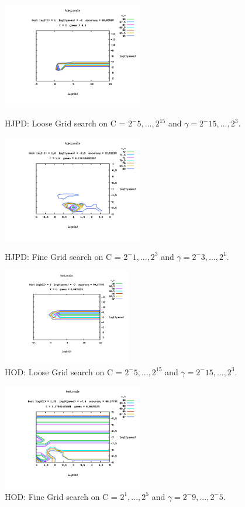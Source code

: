 \documentclass[11pt,nocopyrightspace]{config}
\begin{document}
\begin{figure}[p]
	\centering
	\includegraphics[width=0.55\textwidth]{coarseGridHjpd}
	\caption{HJPD: Loose Grid search on C = $2^-5,...,2^15$ and $\gamma=2^-15,...,2^3$.}
	\label{fig:looseHjpd}
	\includegraphics[width=0.55\textwidth]{fineGridHjpd}
	\caption{HJPD: Fine Grid search on C = $2^-1,...,2^3$ and $\gamma=2^-3,...,2^1$.}
	\label{fig:fineHjpd}
	\includegraphics[width=0.5\textwidth]{coarseGridHod}
	\caption{HOD: Loose Grid search on C = $2^-5,...,2^15$ and $\gamma=2^-15,...,2^3$.}
	\label{fig:looseHod}
\end{figure}
\begin{figure}[t]
	\centering
	\includegraphics[width=0.55\textwidth]{fineGridHod}
	\caption{HOD: Fine Grid search on C = $2^1,...,2^5$ and $\gamma=2^-9,...,2^-5$.}
	\label{fig:fineHod}
\end{figure}
\end{document}
